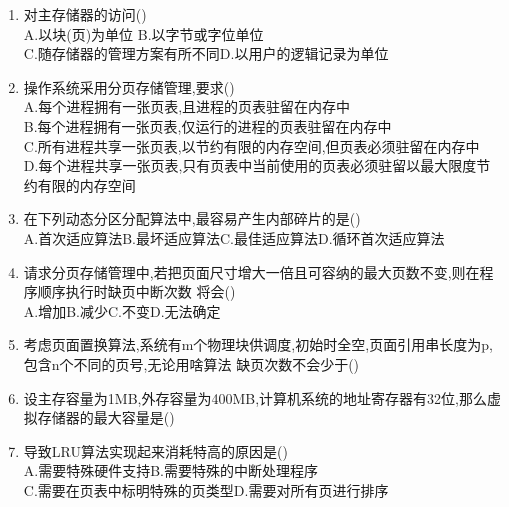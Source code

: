 \documentclass[12pt, a4paper, oneside, UTF8]{ctexbook}
\begin{document}
\begin{enumerate}
    \item 对主存储器的访问() \\
    A.以块(页)为单位 \qquad B.以字节或字位单位 \\
    C.随存储器的管理方案有所不同\qquad D.以用户的逻辑记录为单位

    \item 操作系统采用分页存储管理,要求() \\
    A.每个进程拥有一张页表,且进程的页表驻留在内存中 \\
    B.每个进程拥有一张页表,仅运行的进程的页表驻留在内存中\\
    C.所有进程共享一张页表,以节约有限的内存空间,但页表必须驻留在内存中 \\
    D.每个进程共享一张页表,只有页表中当前使用的页表必须驻留以最大限度节约有限的内存空间

    \item 在下列动态分区分配算法中,最容易产生内部碎片的是()  \\
    A.首次适应算法\qquad B.最坏适应算法\qquad C.最佳适应算法\qquad D.循环首次适应算法

    \item 请求分页存储管理中,若把页面尺寸增大一倍且可容纳的最大页数不变,则在程序顺序执行时缺页中断次数
    将会() \\
    A.增加\qquad B.减少\qquad C.不变\qquad D.无法确定

    \item 考虑页面置换算法,系统有m个物理块供调度,初始时全空,页面引用串长度为p,包含n个不同的页号,无论用啥算法
    缺页次数不会少于()

    \item 设主存容量为1MB,外存容量为400MB,计算机系统的地址寄存器有32位,那么虚拟存储器的最大容量是() 

    \item 导致LRU算法实现起来消耗特高的原因是() \\
    A.需要特殊硬件支持\qquad B.需要特殊的中断处理程序 \\
    C.需要在页表中标明特殊的页类型\qquad D.需要对所有页进行排序

\end{enumerate}

\ifx\allfiles\undefined
\end{document}
